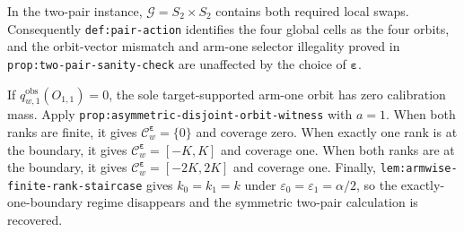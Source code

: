 In the two-pair instance, \(\mathcal G=S_2\times S_2\) contains both required local swaps. Consequently \texttt{def:pair-action} identifies the four global cells as the four orbits, and the orbit-vector mismatch and arm-one selector illegality proved in \texttt{prop:two-pair-sanity-check} are unaffected by the choice of \(\boldsymbol\varepsilon\).

If \(q^{\mathrm{obs}}_{w,1}(O_{1,1})=0\), the sole target-supported arm-one orbit has zero calibration mass. Apply \texttt{prop:asymmetric-disjoint-orbit-witness} with \(a=1\). When both ranks are finite, it gives \(\mathcal C^{\boldsymbol\varepsilon}_w=\{0\}\) and coverage zero. When exactly one rank is at the boundary, it gives \(\mathcal C^{\boldsymbol\varepsilon}_w=[-K,K]\) and coverage one. When both ranks are at the boundary, it gives \(\mathcal C^{\boldsymbol\varepsilon}_w=[-2K,2K]\) and coverage one. Finally, \texttt{lem:armwise-finite-rank-staircase} gives \(k_0=k_1=k\) under \(\varepsilon_0=\varepsilon_1=\alpha/2\), so the exactly-one-boundary regime disappears and the symmetric two-pair calculation is recovered.